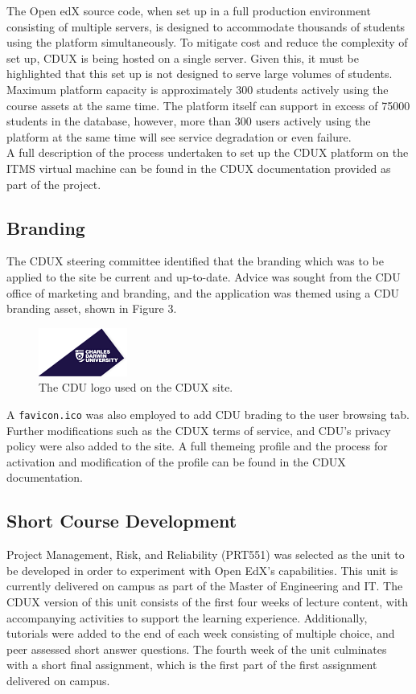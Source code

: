 \documentclass[a4paper]{article}
\begin{document}
The Open edX source code, when set up in a full production environment consisting of multiple servers, is designed to accommodate thousands of students using the platform simultaneously. To mitigate cost and reduce the complexity of set up, CDUX is being hosted on a single server. Given this, it must be highlighted that this set up is not designed to serve large volumes of students. Maximum platform capacity is approximately 300 students actively using the course assets at the same time. The platform itself can support in excess of 75000 students in the database, however, more than 300 users actively using the platform at the same time will see service degradation or even failure.\\

A full description of the process undertaken to set up the CDUX platform on the ITMS virtual machine can be found in the CDUX documentation provided as part of the project.

\subsection{Branding}
The CDUX steering committee identified that the branding which was to be applied to the site be current and up-to-date. Advice was sought from the CDU office of marketing and branding, and the application was themed using a CDU branding asset, shown in Figure 3.
\begin{figure}[h]
\centering
\includegraphics[scale=0.8]{cdu-logo}
\caption{The CDU logo used on the CDUX site.}
\end{figure}

A \verb|favicon.ico| was also employed to add CDU brading to the user browsing tab. Further modifications such as the CDUX terms of service, and CDU's privacy policy were also added to the site. A full themeing profile and the process for activation and modification of the profile can be found in the CDUX documentation.

\subsection{Short Course Development}
Project Management, Risk, and Reliability (PRT551) was selected as the unit to be developed in order to experiment with Open EdX's capabilities. This unit is currently delivered on campus as part of the Master of Engineering and IT. The CDUX  version of this unit consists of the first four weeks of lecture content, with accompanying activities to support the learning experience. Additionally, tutorials were added to the end of each week consisting of multiple choice, and peer assessed short answer questions. The fourth week of the unit culminates with a short final assignment, which is the first part of the first assignment delivered on campus.\\
\end{document}
